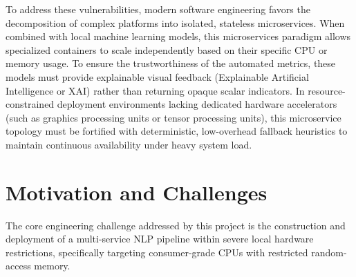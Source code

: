 To address these vulnerabilities, modern software engineering favors the decomposition of complex platforms into isolated, stateless microservices. When combined with local machine learning models, this microservices paradigm allows specialized containers to scale independently based on their specific CPU or memory usage. To ensure the trustworthiness of the automated metrics, these models must provide explainable visual feedback (Explainable Artificial Intelligence or XAI) rather than returning opaque scalar indicators. In resource-constrained deployment environments lacking dedicated hardware accelerators (such as graphics processing units or tensor processing units), this microservice topology must be fortified with deterministic, low-overhead fallback heuristics to maintain continuous availability under heavy system load.

\section{Motivation and Challenges}
The core engineering challenge addressed by this project is the construction and deployment of a multi-service NLP pipeline within severe local hardware restrictions, specifically targeting consumer-grade CPUs with restricted random-access memory. 

